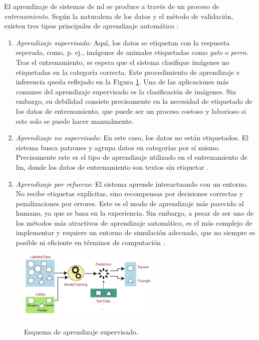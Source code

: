 El aprendizaje de sistemas de \gls{ml} se produce a través de un proceso de \emph{entrenamiento}. Según la naturaleza de los datos y el método de validación, existen tres tipos principales de aprendizaje automático \citep[p. ~38]{torresivinalsPythonDeepLearning2020}:

\begin{enumerate}
    \item \emph{Aprendizaje supervisado:} Aquí, los datos se etiquetan con la respuesta esperada, como, p. ej., imágenes de animales etiquetadas como \emph{gato} o \emph{perro}. Tras el entrenamiento, se espera que el sistema clasifique imágenes no etiquetadas en la categoría correcta. Este procedimiento de aprendizaje e inferencia queda reflejado en la Figura \ref{fig:labeled_data_training}. Una de las aplicaciones más comunes del aprendizaje supervisado es la clasificación de imágenes. Sin embargo, su debilidad consiste precisamente en la necesidad de etiquetado de los datos de entrenamiento, que puede ser un proceso costoso y laborioso si este solo se puede hacer manualmente.
    
    \item \emph{Aprendizaje no supervisado:} En este caso, los datos no están etiquetados. El sistema busca patrones y agrupa datos en categorías por sí mismo. Precisamente este es el tipo de aprendizaje utilizado en el entrenamiento de \gls{lm}, donde los datos de entrenamiento son textos sin etiquetar \citep{radfordLanguageModelsAre2019}.
    
    \item \emph{Aprendizaje por refuerzo:} El sistema aprende interactuando con un entorno. No recibe etiquetas explícitas, sino recompensas por decisiones correctas y penalizaciones por errores. Este es el modo de aprendizaje más parecido al humano, ya que se basa en la experiencia. Sin embargo, a pesar de ser uno de los métodos más atractivos de aprendizaje automático, es el más complejo de implementar y requiere un entorno de simulación adecuado, que no siempre es posible ni eficiente en términos de computación \citep{mohanStructureReinforcementLearning2023}.
\end{enumerate}

\begin{figure}[H]
    \caption[Esquema de aprendizaje supervisado]{Esquema de aprendizaje supervisado.}
    \centering
    \includegraphics[width=0.6\textwidth]{./figuras/labeled_data_training.png}
    \label{fig:labeled_data_training}
\end{figure}


